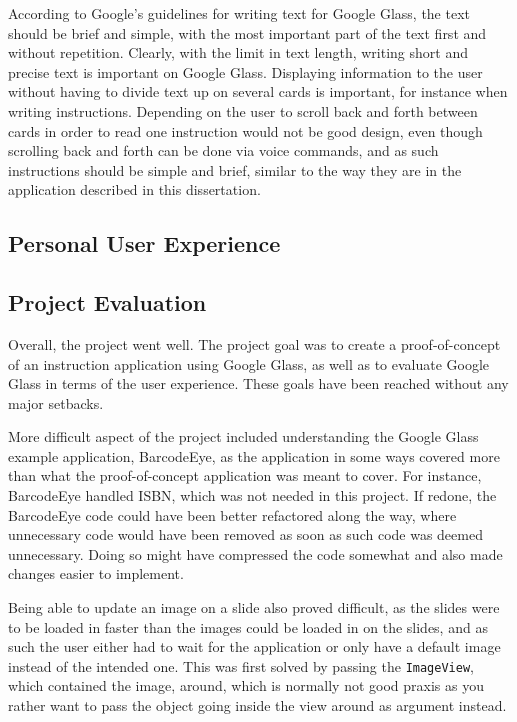 According to Google's guidelines for writing text for Google Glass, the text should be brief and simple, with the most important part of the text first and without repetition. Clearly, with the limit in text length, writing short and precise text is important on Google Glass. Displaying information to the user without having to divide text up on several cards is important, for instance when writing instructions. Depending on the user to scroll back and forth between cards in order to read one instruction would not be good design, even though scrolling back and forth can be done via voice commands, and as such instructions should be simple and brief, similar to the way they are in the application described in this dissertation.

\subsection{Personal User Experience}
\label{subsec:personalexperience}


\subsection{Project Evaluation}
Overall, the project went well. The project goal was to create a proof-of-concept of an instruction application using Google Glass, as well as to evaluate Google Glass in terms of the user experience. These goals have been reached  without any major setbacks. 

More difficult aspect of the project included understanding the Google Glass example application, BarcodeEye, as the application in some ways covered more than what the proof-of-concept application was meant to cover. For instance, BarcodeEye handled ISBN, which was not needed in this project. If redone, the BarcodeEye code could have been better refactored along the way, where unnecessary code would have been removed as soon as such code was deemed unnecessary. Doing so might have compressed the code somewhat and also made changes easier to implement. 

Being able to update an image on a slide also proved difficult, as the slides were to be loaded in faster than the images could be loaded in on the slides, and as such the user either had to wait for the application or only have a default image instead of the intended one. This was first solved by passing the \texttt{ImageView}, which contained the image, around, which is normally not good praxis as you rather want to pass the object going inside the view around as argument instead.

